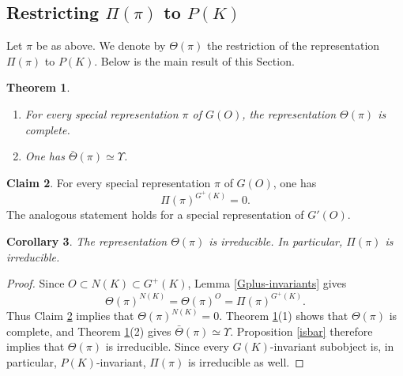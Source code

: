 \documentclass[11pt,a4paper,twoside]{amsart}
\newtheorem{theorem}{Theorem}[section]
\newtheorem{corollary}[theorem]{Corollary}
\theoremstyle{definition}
\newtheorem{claim}[theorem]{Claim}
\theoremstyle{remark}
\begin{document}
\subsection{Restricting $\Pi(\pi)$ to $P(K)$}
Let $\pi$ be as above. We denote by  $\Theta (\pi)$ the restriction of the representation $ \Pi (\pi)$ to $P(K)$. Below is the main result of this Section.
\begin{theorem}\label{exist}
\begin{enumerate}
\item For every special representation $\pi$ of $G(O)$, the representation $\Theta(\pi)$ is complete.
\item One has $\bar\Theta(\pi)\simeq\Upsilon$.
\end{enumerate}
\end{theorem}
\begin{claim}\label{no-Gplus-invariants}
For every special representation $\pi$ of $G(O)$, one has
$$
\Pi(\pi)^{G^+(K)}=0.
$$
The analogous statement holds for a special representation of $G'(O)$.
\end{claim}
\begin{corollary}\label{irrr}
The representation $\Theta(\pi)$ is irreducible. In particular, $\Pi(\pi)$ is irreducible.
\end{corollary}
\begin{proof}
Since $O\subset N(K)\subset G^+(K)$, Lemma \ref{Gplus-invariants} gives
$$
\Theta(\pi)^{N(K)}=\Theta(\pi)^O=\Pi(\pi)^{G^+(K)}.
$$
Thus Claim \ref{no-Gplus-invariants} implies that $\Theta(\pi)^{N(K)}=0$. Theorem \ref{exist}(1) shows that $\Theta(\pi)$ is complete, and Theorem \ref{exist}(2) gives $\bar\Theta(\pi)\simeq\Upsilon$. Proposition \ref{isbar} therefore implies that $\Theta(\pi)$ is irreducible. Since every $G(K)$-invariant subobject is, in particular, $P(K)$-invariant, $\Pi(\pi)$ is irreducible as well.
\end{proof}
\end{document}
